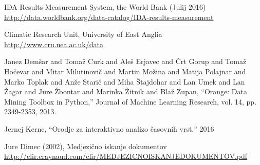 \begin{thebibliography}{1}
 IDA Results Measurement System, the World Bank (Julij 2016)
\\ \url{http://data.worldbank.org/data-catalog/IDA-results-measurement}

 Climatic Research Unit, University of East Anglia
\\ \url{http://www.cru.uea.ac.uk/data}

 Janez Dem\v{s}ar and Toma\v{z} Curk and Ale\v{s} Erjavec and \v{C}rt Gorup and Toma\v{z} Ho\v{c}evar and Mitar Milutinovi\v{c} and Martin Mo\v{z}ina and Matija Polajnar and Marko Toplak and An\v{z}e Stari\v{c} and Miha \v{S}tajdohar and Lan Umek and Lan \v{Z}agar and Jure \v{Z}bontar and Marinka \v{Z}itnik and Bla\v{z} Zupan, ``Orange: Data Mining Toolbox in Python,'' Journal of Machine Learning Research, vol. 14, pp. 2349-2353, 2013.


 Jernej Kernc, ``Orodje za interaktivno analizo časovnih vrst,'' 2016





 Jure Dimec (2002), Medjezično iskanje dokumentov 
\\ \url{http://clir.craynaud.com/clir/MEDJEZICNOISKANJEDOKUMENTOV.pdf}



\end{thebibliography}


